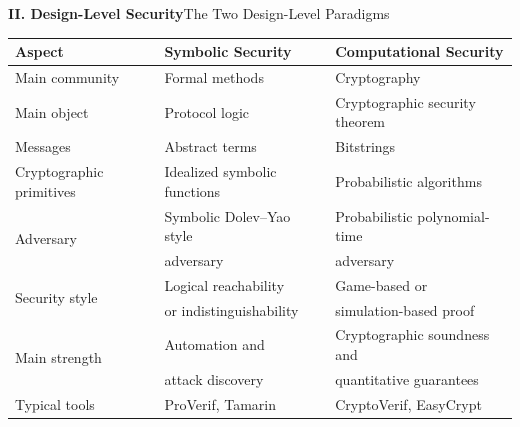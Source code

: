 \documentclass[10pt,aspectratio=1610,compress,dvipsnames]{beamer}
\begin{document}
\begin{frame}[fragile]{\bfseries II. Design-Level Security}{The Two Design-Level Paradigms}
\begin{table}\centering\renewcommand{\arraystretch}{1.25}
\begin{tabular}{l|l|l}
\toprule[1.2pt]
\textbf{Aspect} & \textbf{Symbolic Security} & \textbf{Computational Security} \\ \midrule
Main community  & Formal methods & Cryptography \\ \hline
Main object & Protocol logic & Cryptographic security theorem \\ \hline
Messages & Abstract terms & Bitstrings\\ \hline
\colorbox{magenta!50}{Cryptographic primitives} & Idealized symbolic functions                 & Probabilistic algorithms\\  \hline
\multirow{2}{*}{\colorbox{magenta!50}{Adversary}}   & Symbolic Dolev--Yao style          & Probabilistic polynomial-time\\ 
& adversary & adversary\\ \hline
\multirow{2}{*}{Security style} & Logical reachability & Game-based or\\
&or indistinguishability & simulation-based proof\\ \hline
\multirow{2}{*}{Main strength} & Automation and & Cryptographic soundness and\\ 
& attack discovery & quantitative guarantees\\ \hline
Typical tools            & ProVerif, Tamarin        & CryptoVerif, EasyCrypt \\
\bottomrule[1.2pt]
\end{tabular}
\end{table}
\end{frame}
\end{document}
